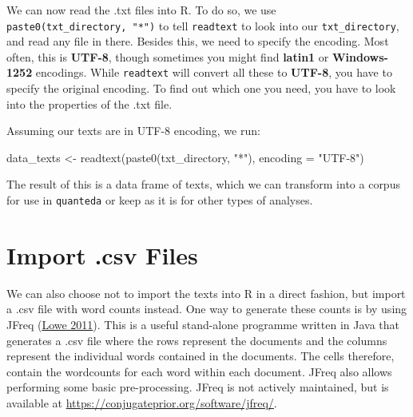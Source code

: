 \documentclass[
]{book}
\newenvironment{Shaded}{\begin{snugshade}}{\end{snugshade}}
\newcommand{\AttributeTok}[1]{\textcolor[rgb]{0.77,0.63,0.00}{#1}}
\newcommand{\FunctionTok}[1]{\textcolor[rgb]{0.00,0.00,0.00}{#1}}
\newcommand{\NormalTok}[1]{#1}
\newcommand{\OtherTok}[1]{\textcolor[rgb]{0.56,0.35,0.01}{#1}}
\newcommand{\StringTok}[1]{\textcolor[rgb]{0.31,0.60,0.02}{#1}}
\begin{document}
We can now read the .txt files into R. To do so, we use \texttt{paste0(txt\_directory,\ "*")} to tell \texttt{readtext} to look into our \texttt{txt\_directory}, and read any file in there. Besides this, we need to specify the encoding. Most often, this is \textbf{UTF-8}, though sometimes you might find \textbf{latin1} or \textbf{Windows-1252} encodings. While \texttt{readtext} will convert all these to \textbf{UTF-8}, you have to specify the original encoding. To find out which one you need, you have to look into the properties of the .txt file.

Assuming our texts are in UTF-8 encoding, we run:

\begin{Shaded}
\begin{Highlighting}[]
\NormalTok{data\_texts }\OtherTok{\textless{}{-}} \FunctionTok{readtext}\NormalTok{(}\FunctionTok{paste0}\NormalTok{(txt\_directory, }\StringTok{"*"}\NormalTok{), }\AttributeTok{encoding =} \StringTok{"UTF{-}8"}\NormalTok{)}
\end{Highlighting}
\end{Shaded}

The result of this is a data frame of texts, which we can transform into a corpus for use in \texttt{quanteda} or keep as it is for other types of analyses.

\hypertarget{import-.csv-files}{%
\section{Import .csv Files}\label{import-.csv-files}}

We can also choose not to import the texts into R in a direct fashion, but import a .csv file with word counts instead. One way to generate these counts is by using JFreq (\protect\hyperlink{ref-Lowe2011b}{Lowe 2011}). This is a useful stand-alone programme written in Java that generates a .csv file where the rows represent the documents and the columns represent the individual words contained in the documents. The cells therefore, contain the wordcounts for each word within each document. JFreq also allows performing some basic pre-processing. JFreq is not actively maintained, but is available at \url{https://conjugateprior.org/software/jfreq/}.
\end{document}
